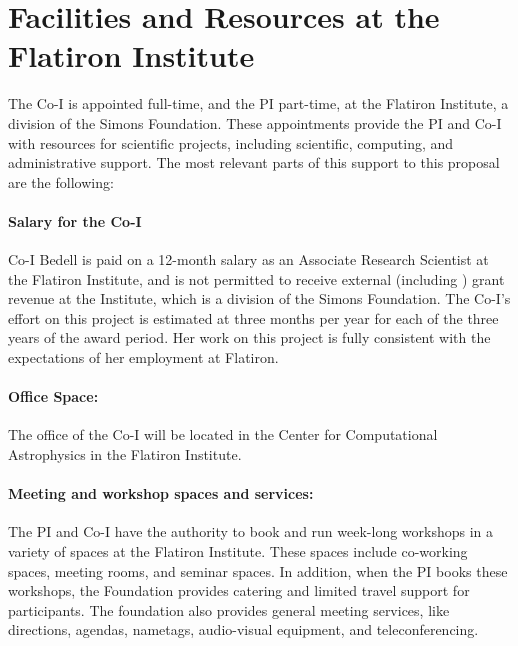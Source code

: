 \documentclass[12pt]{article}
\begin{document}
\section{Facilities and Resources at the Flatiron Institute}

The Co-I is appointed full-time, and the PI part-time,
at the Flatiron Institute, a division of the Simons
Foundation.
These appointments provide the PI and Co-I with resources for
scientific projects, including scientific, computing, and
administrative support.
The most relevant parts of this support to this proposal are the
following:

\paragraph{Salary for the Co-I}

Co-I Bedell is paid on a 12-month salary as an Associate Research
Scientist at the Flatiron Institute, and is not permitted to receive
external (including \NSF) grant revenue at the Institute, which is a division of the Simons
Foundation.  The Co-I's effort on this project is estimated at three months
per year for each of the three years of the award period. Her work on
this project is fully consistent with the expectations of her
employment at Flatiron.

\paragraph{Office Space:}

The office of the Co-I will be located in the Center for Computational
Astrophysics in the Flatiron Institute.

\paragraph{Meeting and workshop spaces and services:}

The PI and Co-I have the authority to book and run week-long workshops in a variety
of spaces at the Flatiron Institute. These spaces include co-working
spaces, meeting rooms, and seminar spaces.  In addition, when the PI
books these workshops, the Foundation provides catering and limited
travel support for participants. The foundation also provides general
meeting services, like directions, agendas, nametags, audio-visual
equipment, and teleconferencing.
\end{document}
